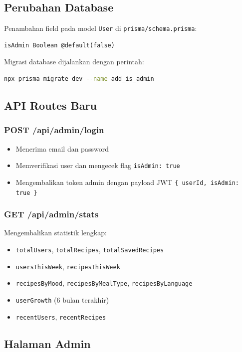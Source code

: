 \documentclass[12pt, a4paper]{article}
\begin{document}
\subsection{Perubahan Database}
Penambahan field pada model \texttt{User} di \texttt{prisma/schema.prisma}:
\begin{lstlisting}
isAdmin Boolean @default(false)
\end{lstlisting}

Migrasi database dijalankan dengan perintah:
\begin{lstlisting}[language=bash]
npx prisma migrate dev --name add_is_admin
\end{lstlisting}

\subsection{API Routes Baru}

\subsubsection{POST /api/admin/login}
\begin{itemize}
  \item Menerima email dan password
  \item Memverifikasi user dan mengecek flag \texttt{isAdmin: true}
  \item Mengembalikan token admin dengan payload JWT \texttt{\{ userId, isAdmin: true \}}
\end{itemize}

\subsubsection{GET /api/admin/stats}
Mengembalikan statistik lengkap:
\begin{itemize}
  \item \texttt{totalUsers}, \texttt{totalRecipes}, \texttt{totalSavedRecipes}
  \item \texttt{usersThisWeek}, \texttt{recipesThisWeek}
  \item \texttt{recipesByMood}, \texttt{recipesByMealType}, \texttt{recipesByLanguage}
  \item \texttt{userGrowth} (6 bulan terakhir)
  \item \texttt{recentUsers}, \texttt{recentRecipes}
\end{itemize}

\subsection{Halaman Admin}
\end{document}
